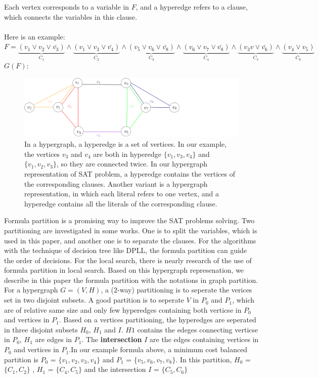 \documentclass[12pt,a4paper,twoside]{scrartcl}
\numberwithin{equation}{section}
\begin{document}
  Each vertex corresponds to a variable in $F$, and a hyperedge refers to a clause, which connects the variables in this clause. \\
\\
Here is an example:\\
$F =\underbrace{(v_1 \lor v_2 \lor \bar{v_3})}_\text{$C_1$} \land \underbrace{(v_1 \lor v_3\lor \bar{v_4})}_\text{$C_2$}\land \underbrace{(v_5 \lor v_6\lor \bar{v_8})}_\text{$C_3$}\land \underbrace{(v_6 \lor v_7\lor \bar{v_8})}_\text{$C_4$}\land \underbrace{(v_3v\lor \bar{v_6})}_\text{$C_5$}\land \underbrace{(v_4 \lor v_5)}_\text{$C_6$}$\\
$G(F)$:
\begin{figure}[H]
\begin{center}
  \includegraphics[scale = 0.4]{1/hypergraph.png}
  \end{center}
  \caption{In a hypergraph, a hyperedge is a set of vertices. In our example, the vertices  $v_3$  and $v_4$ are both in hyperedge $\{v_1, v_3, v_4\}$ and $\{v_1, v_2, v_3\}$, so they are connected twice. In our hypergraph representation of SAT problem, a hyperedge contains the vertices of the corresponding clauses. Another variant is a hypergraph representation, in which each literal refers to one vertex, and a hyperedge contains all the literals of the corresponding clause.}
  \label{hypergraph representation}
  \end{figure}

Formula partition is a promising way to improve the SAT problems solving. Two partitioning are investigated in some works. One is to split the variables, which is used in this paper, and another one is to separate the clauses. For the algorithms with the technique of decision tree like DPLL, the formula partition can guide the order of decisions. For the local search, there is nearly research of the use of formula partition in local search. Based on this hypergraph represenation, we describe in this paper the formula partition with the notations in graph partition. For a hypergraph $G = (V,H)$,  a ($2$-way) partitioning is to seperate the verices set in two disjoint subsets. A good partition is to seperate $V$ in $P_0$ and $P_1$, which are of relative same size and only few hyperedges containing both verticse in $P_0$ and vertices in $P_1$.  Based on a vertices partitioning, the hyperedges are seperated in three disjoint subsets $H_0$, $H_1$ and $I$. $H1$ contains the edeges connecting verticse in $P_0$, $H_1$ are edges in $P_1$. The \textbf{intersection} $I$ are the edges containing vertices in $P_0$ and vertices in $P_1$.In our example formula above, a minimum cost balanced partition is $P_0$ = $\{v_1,v_2, v_3, v_4\}$ and $P_1$ = $\{v_5,v_6, v_7, v_8\}$. In this partition, $H_0$ = $\{C_1,C_2\}$ , $H_1$ = $\{C_4,C_5\}$ and the intersection $I$ = $\{C_5,C_6\}$ 
\clearpage
\end{document}
